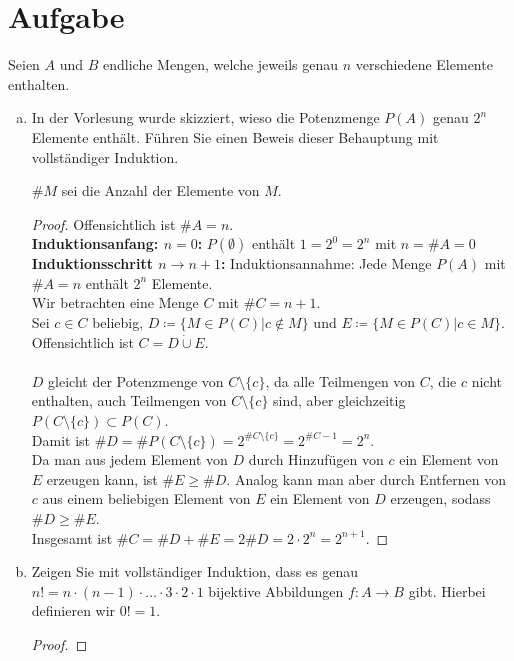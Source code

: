 \documentclass{article}
\begin{document}
\section{Aufgabe}
Seien $A$ und $B$ endliche Mengen, welche jeweils genau $n$ verschiedene Elemente enthalten.
\begin{enumerate}[a)]
	\item In der Vorlesung wurde skizziert, wieso die Potenzmenge $P(A)$ genau $2^n$ Elemente enthält.
	Führen Sie einen Beweis dieser Behauptung mit vollständiger Induktion.
	\begin{definition}
		$\#M$ sei die Anzahl der Elemente von $M$.
	\end{definition}
	\begin{proof}
		Offensichtlich ist $\#A = n$.\\
		\textbf{Induktionsanfang: $n= 0$:} \hspace*{3mm}$P(\emptyset)$ enthält $1 = 2^0 = 2^n$ mit $n = \#A = 0$\\
		\textbf{Induktionsschritt $n \to n+1$:}\hspace*{3mm} Induktionsannahme: Jede Menge $P(A)$ mit $\#A = n$ enthält $2^n$ Elemente.\\
		Wir betrachten eine Menge $C$ mit $\#C = n+1$.\\
		Sei $c\in C$ beliebig, $D \coloneqq \{M \in P(C)|c \notin M\}$ und $E \coloneqq \{M \in P(C)|c \in M\}$. Offensichtlich ist $C = D \dot{\cup} E$.\\\ \\
		$D$ gleicht der Potenzmenge von $C\setminus \{c\}$, da alle Teilmengen von $C$, die $c$ nicht enthalten, auch Teilmengen von $C\setminus \{c\}$ sind, aber gleichzeitig $P(C\setminus \{c\}) \subset P(C)$.\\
		Damit ist $\#D = \#P(C\setminus \{c\}) = 2^{\#C\setminus \{c\}} = 2 ^{\#C-1} = 2^n$.\\
		Da man aus jedem Element von $D$ durch Hinzufügen von $c$ ein Element von $E$ erzeugen kann, ist $\# E \geq \# D$. Analog kann man aber durch Entfernen von $c$ aus einem beliebigen Element von $E$ ein Element von $D$ erzeugen, sodass $\# D \geq \# E$. \\
		Insgesamt ist $\# C = \# D + \# E = 2 \# D = 2\cdot 2^n = 2 ^{n+1}$.
	\end{proof}
	\item Zeigen Sie mit vollständiger Induktion, dass es genau $n! = n \cdot (n - 1)\cdot \dots \cdot 3 \cdot 2 \cdot 1$ bijektive
	Abbildungen $f : A \to B$ gibt. Hierbei definieren wir $0! = 1$.
	\begin{proof}

\end{proof}
\end{enumerate}
\end{document}
